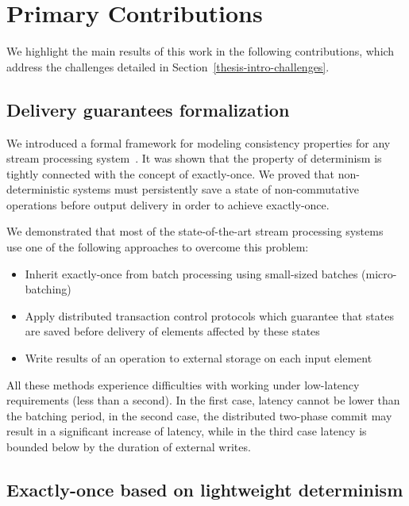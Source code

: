 \section{Primary Contributions}

We highlight the main results of this work in the following contributions, which address the challenges detailed in Section~\ref{thesis-intro-challenges}.

\subsection{Delivery guarantees formalization}

We introduced a formal framework for modeling consistency properties for any stream processing system~\cite{thepaper}. It was shown that the property of determinism is tightly connected with the concept of exactly-once. We proved that non-deterministic systems must persistently save a state of non-commutative operations before output delivery in order to achieve exactly-once.

We demonstrated that most of the state-of-the-art stream processing systems~\cite{Carbone:2017:SMA:3137765.3137777, Zaharia:2012:DSE:2342763.2342773, Akidau:2013:MFS:2536222.2536229, apache:storm:trident} use one of the following approaches to overcome this problem: 

\begin{itemize}
    \item Inherit exactly-once from batch processing using small-sized batches (micro-batching)
    \item Apply distributed transaction control protocols which guarantee that states are saved before delivery of elements affected by these states
    \item Write results of an operation to external storage on each input element
\end{itemize}

All these methods experience difficulties with working under low-latency requirements (less than a second). In the first case, latency cannot be lower than the batching period, in the second case, the distributed two-phase commit may result in a significant increase of latency, while in the third case latency is bounded below by the duration of external writes.

\subsection{Exactly-once based on lightweight determinism}

